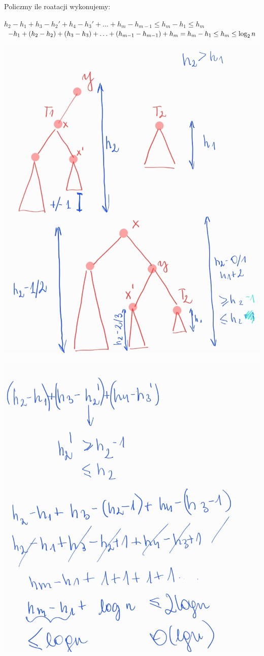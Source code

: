\documentclass[12pt]{article}
\begin{document}
Policzmy ile roatacji wykonujemy:

$h_2 - h_1 + h_3 - h_2' + h_4 - h_3' + \ldots + h_m - h_{m-1} \leq h_m - h_1 \le h_m$\\
$-h_1 + (h_2 - h_2) + (h_3 - h_3) + \ldots +(h_{m-1} -h_{m-1}) + h_m = h_m - h_1 \le h_m\\ \le \log_2n $

\includegraphics[scale=0.5]{7_4.png}

\includegraphics[scale=0.5]{7_5.png}
\end{document}
